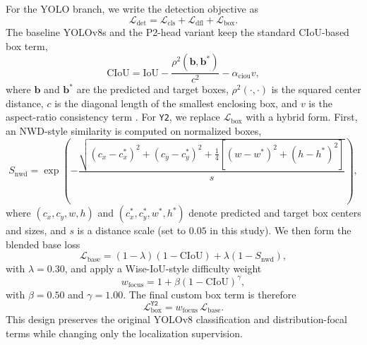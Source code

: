\documentclass[10pt,a4paper]{article}
\begin{document}
For the YOLO branch, we write the detection objective as
\begin{equation}
\mathcal{L}_{\text{det}} = \mathcal{L}_{\text{cls}} + \mathcal{L}_{\text{dfl}} + \mathcal{L}_{\text{box}}.
\end{equation}
The baseline YOLOv8s and the P2-head variant keep the standard CIoU-based box term,
\begin{equation}
\mathrm{CIoU} = \mathrm{IoU} - \frac{\rho^2(\mathbf{b}, \mathbf{b}^{\ast})}{c^2} - \alpha_{\mathrm{ciou}} v,
\end{equation}
where $\mathbf{b}$ and $\mathbf{b}^{\ast}$ are the predicted and target boxes, $\rho^2(\cdot,\cdot)$ is the squared center distance, $c$ is the diagonal length of the smallest enclosing box, and $v$ is the aspect-ratio consistency term \citep{zheng_2020_diou}. For \texttt{Y2}, we replace $\mathcal{L}_{\text{box}}$ with a hybrid form. First, an NWD-style similarity is computed on normalized boxes,
\begin{equation}
S_{\mathrm{nwd}} = \exp\!\left(
-\frac{
\sqrt{
(c_x-c_x^{\ast})^2 + (c_y-c_y^{\ast})^2 +
\frac{1}{4}\left[(w-w^{\ast})^2 + (h-h^{\ast})^2\right]
}
}{s}
\right),
\end{equation}
where $(c_x, c_y, w, h)$ and $(c_x^{\ast}, c_y^{\ast}, w^{\ast}, h^{\ast})$ denote predicted and target box centers and sizes, and $s$ is a distance scale (set to $0.05$ in this study). We then form the blended base loss
\begin{equation}
\mathcal{L}_{\text{base}} = (1-\lambda)(1-\mathrm{CIoU}) + \lambda(1-S_{\mathrm{nwd}}),
\end{equation}
with $\lambda = 0.30$, and apply a Wise-IoU-style difficulty weight
\begin{equation}
w_{\mathrm{focus}} = 1 + \beta (1-\mathrm{CIoU})^{\gamma},
\end{equation}
with $\beta = 0.50$ and $\gamma = 1.00$. The final custom box term is therefore
\begin{equation}
\mathcal{L}_{\text{box}}^{\texttt{Y2}} = w_{\mathrm{focus}} \, \mathcal{L}_{\text{base}}.
\end{equation}
This design preserves the original YOLOv8 classification and distribution-focal terms while changing only the localization supervision.
\end{document}
